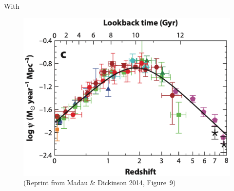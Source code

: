 With 

\begin{figure}[htbp]
	\centering
	\includegraphics[width=.6\linewidth]{Chapter_1/Figures/Madau2014_Figure9.png}
    \caption[Reprint from Madau \& Dickinson 2014 (Figure~9)]{\label{fig:Madau2014_figure9}
        (Reprint from Madau \& Dickinson 2014, Figure~9)\\
    }
\end{figure}





